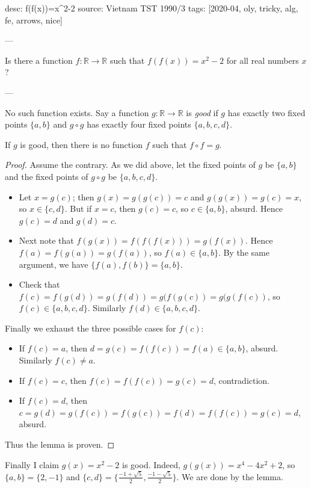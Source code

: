 desc: f(f(x))=x^2-2
source: Vietnam TST 1990/3
tags: [2020-04, oly, tricky, alg, fe, arrows, nice]

---

Is there a function $f:\mathbb R\to\mathbb R$ such that $f(f(x))=x^2-2$ for all real numbers $x$?

---

No such function exists. Say a function $g:\mathbb R\to\mathbb R$ is \emph{good} if $g$ has exactly two fixed points $\{a,b\}$ and $g\circ g$ has exactly four fixed points $\{a,b,c,d\}$.
\begin{lemma*}
    If $g$ is good, then there is no function $f$ such that $f\circ f=g$.
\end{lemma*}
\begin{proof}
    Assume the contrary. As we did above, let the fixed points of $g$ be $\{a,b\}$ and the fixed points of $g\circ g$ be $\{a,b,c,d\}$.
    \begin{itemize}
        \item Let $x=g(c)$; then $g(x)=g(g(c))=c$ and $g(g(x))=g(c)=x$, so $x\in\{c,d\}$. But if $x=c$, then $g(c)=c$, so $c\in\{a,b\}$, absurd. Hence $g(c)=d$ and $g(d)=c$.
        \item Next note that $f(g(x))=f(f(f(x)))=g(f(x))$. Hence $f(a)=f(g(a))=g(f(a))$, so $f(a)\in\{a,b\}$. By the same argument, we have $\{f(a),f(b)\}=\{a,b\}$.
        \item Check that $f(c)=f(g(d))=g(f(d))=g(f(g(c))=g(g(f(c))$, so $f(c)\in\{a,b,c,d\}$. Similarly $f(d)\in\{a,b,c,d\}$.
    \end{itemize}

    Finally we exhaust the three possible cases for $f(c)$:
    \begin{itemize}[itemsep=0em]
        \item If $f(c)=a$, then $d=g(c)=f(f(c))=f(a)\in\{a,b\}$, absurd. Similarly $f(c)\ne a$.
        \item If $f(c)=c$, then $f(c)=f(f(c))=g(c)=d$, contradiction.
        \item If $f(c)=d$, then $c=g(d)=g(f(c))=f(g(c))=f(d)=f(f(c))=g(c)=d$, absurd.
    \end{itemize}
    Thus the lemma is proven.
\end{proof}

Finally I claim $g(x)=x^2-2$ is good. Indeed, $g(g(x))=x^4-4x^2+2$, so $\{a,b\}=\{2,-1\}$ and $\{c,d\}=\{\tfrac{-1+\sqrt5}2,\tfrac{-1-\sqrt5}2\}$. We are done by the lemma.
